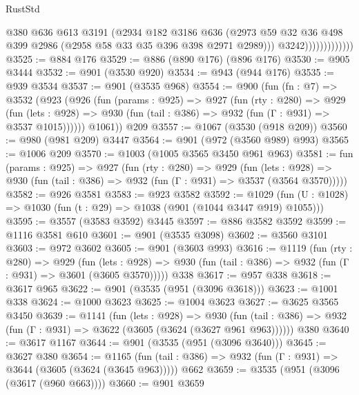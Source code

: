 \begin{lexlean}{RustStd}
\begin{coremodule}
{\begin{coremodule}
{{{{{{{{{{{{{{                              @380
                              @636
                              @613
                              @3191
                              (@2934
                                @182
                                @3186
                                @636
                                (@2973
                                  @59
                                  @32
                                  @36
                                  @498
                                  @399
                                  @2986
                                  (@2958 @58 @33 @35 @396 @398 @2971 @2989)))
                              @3242)))))))))))))
@3525 := @884 @176
@3529 := @886 (@890 @176) (@896 @176)
@3530 := @905 @3444
@3532 := @901 (@3530 @920)
@3534 := @943 (@944 @176)
@3535 := @939 @3534
@3537 := @901 (@3535 @968)
@3554 := @900
    (fun (fn : @7) =>
    @3532
      (@923
        (@926
          (fun (params : @925) =>
          @927
            (fun (rty : @280) =>
            @929
              (fun (lets : @928) =>
              @930 (fun (tail : @386) => @932 (fun (Γ : @931) => @3537 @1015))))))
        @1061))
    @209
@3557 := @1067 (@3530 (@918 @209))
@3560 := @980 (@981 @209) @3447
@3564 := @901 (@972 (@3560 @989) @993)
@3565 := @1006 @209
@3570 := @1003 (@1005 @3565 @3450 @961 @963)
@3581 := fun (params : @925) =>
  @927
    (fun (rty : @280) =>
    @929
      (fun (lets : @928) =>
      @930 (fun (tail : @386) => @932 (fun (Γ : @931) => @3537 (@3564 @3570)))))
@3582 := @926 @3581
@3583 := @923 @3582
@3592 := @1029 (fun (U : @1028) => @1030 (fun (t : @29) => @1038 (@901 (@1044 @3447 @919) @1055)))
@3595 := @3557 (@3583 @3592) @3445
@3597 := @886 @3582 @3592
@3599 := @1116 @3581 @610
@3601 := @901 (@3535 @3098)
@3602 := @3560 @3101
@3603 := @972 @3602
@3605 := @901 (@3603 @993)
@3616 := @1119
    (fun (rty : @280) =>
    @929
      (fun (lets : @928) =>
      @930 (fun (tail : @386) => @932 (fun (Γ : @931) => @3601 (@3605 @3570)))))
    @338
@3617 := @957 @338
@3618 := @3617 @965
@3622 := @901 (@3535 (@951 (@3096 @3618)))
@3623 := @1001 @338
@3624 := @1000 @3623
@3625 := @1004 @3623
@3627 := @3625 @3565 @3450
@3639 := @1141
    (fun (lets : @928) =>
    @930 (fun (tail : @386) => @932 (fun (Γ : @931) => @3622 (@3605 (@3624 (@3627 @961 @963))))))
    @380
@3640 := @3617 @1167
@3644 := @901 (@3535 (@951 (@3096 @3640)))
@3645 := @3627 @380
@3654 := @1165
    (fun (tail : @386) => @932 (fun (Γ : @931) => @3644 (@3605 (@3624 (@3645 @963)))))
    @662
@3659 := @3535 (@951 (@3096 (@3617 (@960 @663))))
@3660 := @901 @3659
}}}}}}}}}}}}}}
\end{coremodule}}
\end{coremodule}
\end{lexlean}
